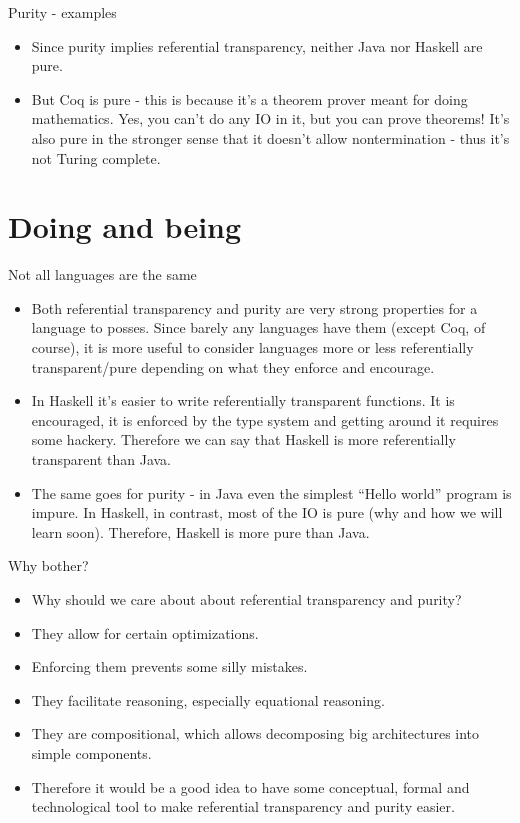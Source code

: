 \documentclass{beamer}
\begin{document}
\begin{frame}{Purity - examples}
\begin{itemize}
	\item Since purity implies referential transparency, neither Java nor Haskell are pure.
	\item But Coq is pure - this is because it's a theorem prover meant for doing mathematics. Yes, you can't do any IO in it, but you can prove theorems! It's also pure in the stronger sense that it doesn't allow nontermination - thus it's not Turing complete.
\end{itemize}
\end{frame}

\section{Doing and being}

\begin{frame}{Not all languages are the same}
\begin{itemize}
	\item Both referential transparency and purity are very strong properties for a language to posses. Since barely any languages have them (except Coq, of course), it is more useful to consider languages more or less referentially transparent/pure depending on what they enforce and encourage.
	\item In Haskell it's easier to write referentially transparent functions. It is encouraged, it is enforced by the type system and getting around it requires some hackery. Therefore we can say that Haskell is more referentially transparent than Java.
	\item The same goes for purity - in Java even the simplest ``Hello world'' program is impure. In Haskell, in contrast, most of the IO is pure (why and how we will learn soon). Therefore, Haskell is more pure than Java.
\end{itemize}
\end{frame}

\begin{frame}{Why bother?}
\begin{itemize}
	\item Why should we care about about referential transparency and purity?
	\item They allow for certain optimizations.
	\item Enforcing them prevents some silly mistakes.
	\item They facilitate reasoning, especially equational reasoning.
	\item They are compositional, which allows decomposing big architectures into simple components.
	\item Therefore it would be a good idea to have some conceptual, formal and technological tool to make referential transparency and purity easier.
\end{itemize}
\end{frame}
\end{document}
